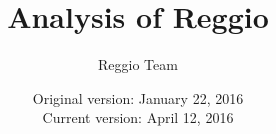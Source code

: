 \documentclass[12pt]{article}
\begin{document}
\title{Analysis of Reggio}
\author{Reggio Team}
\date{Original version: January 22, 2016 \\ Current version: April 12, 2016} %
\maketitle 

\doublespacing

%
%
%
%
%


\pagebreak



\appendix
%

\end{document}
